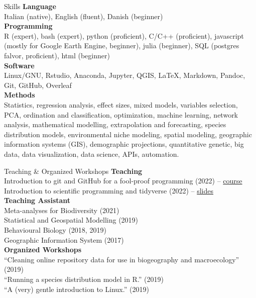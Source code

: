 \documentclass{resume} %
\begin{document}
\begin{rSection}{Skills}
{\bf Language}\\
Italian (native), English (fluent), Danish (beginner)\\
{\bf Programming}\\
R (expert), bash (expert), python (proficient), C/C++ (proficient), javascript (mostly for Google Earth Engine, beginner), julia (beginner), SQL (postgres falvor, proficient), html (beginner)\\
{\bf Software} \\
Linux/GNU, Rstudio, Anaconda, Jupyter, QGIS, \LaTeX, Markdown, Pandoc, Git, GitHub, Overleaf\\
{\bf Methods} \\
Statistics, regression analysis, effect sizes, mixed models, variables selection, PCA, ordination and classification, optimization, machine learning, network analysis, mathematical modelling, extrapolation and forecasting, species distribution models, environmental niche modeling, spatial modeling, geographic information systems (GIS), demographic projections, quantitative genetic, big data, data visualization, data science, APIs, automation.
\end{rSection}

\begin{rSection}{Teaching \& Organized Workshops}
{\bf Teaching} \\
Introduction to git and GitHub for a fool-proof programming (2022) -- \href{https://emilio-berti.github.io/idiv-git-introduction/}{course}\\
Introduction to scientific programming and tidyverse (2022) -- \href{https://emilio-berti.github.io/teaching/tidyverse.html#(1)}{slides}\\
{\bf Teaching Assistant} \\
Meta-analyses for Biodiversity (2021)\\
Statistical and Geospatial Modelling (2019)\\
Behavioural Biology (2018, 2019)\\
Geographic Information System (2017)\\
{\bf Organized Workshops}\\
``Cleaning online repository data for use in biogeography and macroecology'' (2019)\\
``Running a species distribution model in R.'' (2019)\\
``A (very) gentle introduction to Linux.'' (2019)
\end{rSection}
\end{document}
